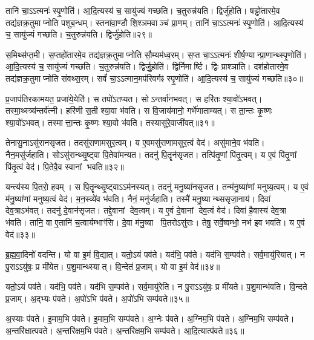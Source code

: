 तानि॑ चा॒ऽऽत्मनः॑ स्पृ॒णोति॑।
आ॒दि॒त्यस्य॑ च॒ सायु॑ज्यं गच्छति।
च॒तुरुन्न॑यति।
द्विर्जु॑होति।
षड्ढो॑तारमे॒व तद्य॑ज्ञक्र॒तुमाप्नोति पशुब॒न्धम्।
स्तना॑वा॒ण्डौ शि॒श्ञमवाञ्चं प्रा॒णम्।
तानि॑ चा॒ऽऽत्मनः॑ स्पृ॒णोति॑।
आ॒दि॒त्यस्य॑ च॒ सायु॑ज्यं गच्छति।
च॒तुरुन्न॑यति।
द्विर्जु॑होति॥२९॥

स॒मिथ्स॑प्त॒मी।
स॒प्तहो॑तारमे॒व तद्य॑ज्ञक्र॒तुमाप्नोति सौ॒म्यम॑ध्व॒रम्।
स॒प्त चा॒ऽऽत्मनः॑ शीर्\mbox{}ष॒ण्यान्प्रा॒णान्थ्स्पृ॒णोति॑।
आ॒दि॒त्यस्य॑ च॒ सायु॑ज्यं गच्छति।
च॒तुरुन्न॑यति।
द्विर्जु॒होति॑।
द्विर्निमार्ष्टि।
द्विः प्राश्ञा॑ति।
दश॑होतारमे॒व तद्य॑ज्ञक्र॒तुमाप्नोति संवथ्स॒रम्।
सर्वं॑ चा॒ऽऽत्मान॒मप॑रिवर्गꣴ स्पृ॒णोति॑।
आ॒दि॒त्यस्य॑ च॒ सायु॑ज्यं गच्छति॥३०॥\anuvakamend[अ॒ग्नि॒हो॒त्रं म॒ज्जान॒न्द्विर्जु॑हो॒त्यप॑रिवर्गꣴ स्पृ॒णोत्येकं॑ च]

प्र॒जाप॑तिरकामयत॒ प्रजा॑ये॒येति॑।
स तपो॑\-ऽतप्यत।
सोऽन्तर्वा॑नभवत्।
स हरि॑तः श्या॒वो॑\-ऽभवत्।
तस्मा॒थ्स्त्र्य॑न्तर्व॑त्नी।
हरि॑णी स॒ती श्या॒वा भ॑वति।
स वि॒जाय॑मानो॒ गर्भे॑णाताम्यत्।
स ता॒न्तः कृ॒ष्णः श्या॒वो॑\-ऽभवत्।
तस्मात्ता॒न्तः कृ॒ष्णः श्या॒वो भ॑वति।
तस्यासु॑रे॒वाजी॑वत्॥३१॥

तेनासु॒ना\-ऽसु॑रानसृजत।
तदसु॑राणामसुर॒त्वम्।
य ए॒वमसु॑राणामसुर॒त्वं वेद॑।
असु॑माने॒व भ॑वति।
नैन॒मसु॑र्जहाति।
सोऽसु॑रान्थ्सृ॒ष्ट्वा पि॒तेवा॑मन्यत।
तदनु॑ पि॒तॄन॑सृजत।
तत्पि॑तृ॒णां पि॑तृ॒त्वम्।
य ए॒वं पि॑तृ॒णां पि॑तृ॒त्वं वेद॑।
पि॒तेवै॒व स्वानां भवति॥३२॥

यन्त्य॑स्य पि॒तरो॒ हवम्।
स पि॒तॄन्थ्सृ॒ष्ट्वा\-ऽऽम॑नस्यत्।
तदनु॑ मनु॒ष्या॑नसृजत।
तन्म॑नु॒ष्या॑णां मनुष्य॒त्वम्।
य ए॒वं म॑नु॒ष्या॑णां मनुष्य॒त्वं वेद॑।
म॒न॒स्व्ये॑व भ॑वति।
नैनं॒ मनु॑र्जहाति।
तस्मै॑ मनु॒ष्यान्थ्ससृजा॒नाय॑।
दिवा॑ देव॒त्रा\-ऽभ॑वत्।
तदनु॑ दे॒वान॑सृजत।
तद्दे॒वानां देव॒त्वम्।
य ए॒वं दे॒वानां देव॒त्वं वेद॑।
दिवा॑ है॒वास्य॑ देव॒त्रा भ॑वति।
तानि॒ वा ए॒तानि॑ च॒त्वार्यम्भाꣳ॑सि।
दे॒वा म॑नु॒ष्या पि॒तरो\-ऽसु॑राः।
तेषु॒ सर्वे॒ष्वम्भो॒ नभ॑ इव भवति।
य ए॒वं वेद॑॥३३॥\anuvakamend[अ॒जी॒व॒थ्स्वानां भवति दे॒वान॑सृजत स॒प्त च॑]

ब्र॒ह्म॒वा॒दिनो॑ वदन्ति।
यो वा इ॒मं वि॒द्यात्।
यतो॒ऽयं पव॑ते।
यद॑भि॒ पव॑ते।
यद॑भि स॒म्पव॑ते।
सर्व॒मायु॑रियात्।
न पु॒रा\-ऽऽयु॑षः॒ प्र मी॑येत।
प॒शु॒मान्थ्स्यात्।
वि॒न्देत॑ प्र॒जाम्।
यो वा इ॒मं वेद॑॥३४॥

यतो॒ऽयं पव॑ते।
यद॑भि॒ पव॑ते।
यद॑भि स॒म्पव॑ते।
सर्व॒मायु॑रेति।
न पु॒रा\-ऽऽयु॑षः॒ प्र मी॑यते।
प॒शु॒मान्भ॑वति।
वि॒न्दते प्र॒जाम्।
अ॒द्भ्यः प॑वते।
अ॒पो॑ऽभि प॑वते।
अ॒पो॑ऽभि सम्प॑वते॥३५॥

अ॒स्याः प॑वते।
इ॒माम॒भि प॑वते।
इ॒माम॒भि सम्प॑वते।
अ॒ग्नेः प॑वते।
अ॒ग्निम॒भि प॑वते।
अ॒ग्निम॒भि सम्प॑वते।
अ॒न्तरि॑क्षात्पवते।
अ॒न्तरि॑क्षम॒भि प॑वते।
अ॒न्तरि॑क्षम॒भि सम्प॑वते।
आ॒दि॒त्यात्प॑वते॥३६॥

